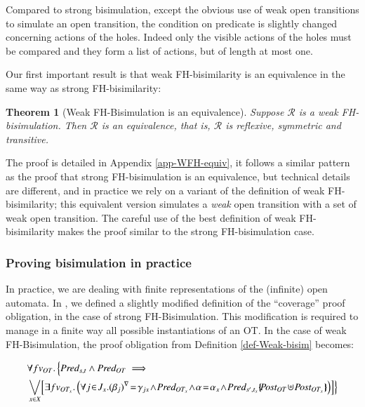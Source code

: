 \documentclass{elsarticle}
\newtheorem{thm}{Theorem}
\begin{document}
Compared to strong bisimulation, except the obvious use of weak open transitions to simulate an open transition, the condition on predicate is slightly changed concerning actions of the holes. Indeed only the visible actions of the holes must be compared and they form a list of actions, but of length at most one.




Our first important result is that weak FH-bisimilarity is an equivalence in the same way as strong FH-bisimilarity:


\begin{thm}[Weak FH-Bisimulation is an equivalence]\label{thm-weak-equiv} Suppose $\mathcal{R}$ 
is a weak FH-bisimulation. Then $\mathcal{R}$ is an equivalence, that is, $\mathcal{R}$ is 
reflexive, symmetric and transitive.
\end{thm}
The proof  is detailed in Appendix \ref{app-WFH-equiv}, it follows a similar pattern as the proof that strong FH-bisimulation is an equivalence, but technical details are different, and in practice we rely on a variant of the definition of weak FH-bisimilarity; this equivalent version simulates a \emph{weak} open transition with a set of weak open transition. The careful use of the best definition of weak FH-bisimilarity makes the proof similar to the strong FH-bisimulation case.

\subsubsection*{Proving bisimulation in practice}

In practice, we are dealing with finite representations of the (infinite) open automata. In \cite{hou:hal-02406098}, we defined a slightly modified definition of the ``coverage'' proof obligation, in the case of strong FH-Bisimulation. This modification is required to manage in a finite way all possible instantiations of an OT. In the case of weak FH-Bisimulation, the proof obligation from Definition \ref{def-Weak-bisim} becomes:
\begin{small}
      \begin{align*}
&\forall fv_{OT}.\, \Big\{ \Pred_{s,t} \land \Pred_{OT} \implies\\
& \bigvee_{x\in X}\!
  \left[\exists fv_{OT_x}.
    \left( \forall j\!\in\! J_x. \vis{\beta_j}\!=\!\gamma_{jx}\! \land\! \Pred_{OT_x}
     \!\land\! \alpha\!=\!\alpha_x\! \land\!  
     \Pred_{s',t_x}\subst{\Post_{OT}\!\uplus\!\Post_{OT_x}}\right)\right]\!\Big\}
\end{align*}
\end{small}
\end{document}
